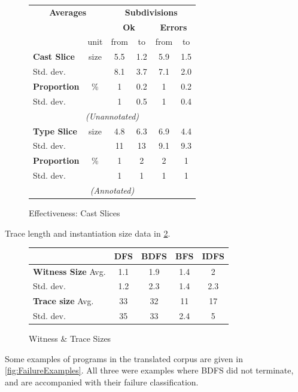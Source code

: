 \begin{figure}[h]
  \centering
  \begin{tabular}{lc|cc|cc}
  \multicolumn{2}{c}{\textbf{Averages}} & \multicolumn{4}{c}{\textbf{Subdivisions}}\\
  & & \multicolumn{2}{c|}{\textbf{Ok}} & \multicolumn{2}{c}{\textbf{Errors}}\\ 
   & unit & from & to & from & to\\
   \hline
   \textbf{Cast Slice} & size &  5.5 & 1.2 & 5.9 & 1.5 \\
   Std. dev. &  				 &  8.1 & 3.7 & 7.1 & 2.0\\
   \textbf{Proportion}& \%    & 1 & 0.2 & 1 & 0.2\\
   Std. dev. &  				 &  1 & 0.5 & 1 & 0.4\\
   \multicolumn{6}{c}{\textit{(Unannotated)}}\\
   \textbf{Type Slice} & size &  4.8 & 6.3 & 6.9 & 4.4  \\
   Std. dev. 			&    &  11 & 13 & 9.1 & 9.3\\
   \textbf{Proportion}& \% 	 & 1 & 2 & 2 & 1\\
   Std. dev. &  				 &  1 & 1 & 1 & 1\\
   \multicolumn{6}{c}{\textit{(Annotated)}}
  \end{tabular}
  \caption{Effectiveness: Cast Slices}
\label{fig:CastSlicingEffectiveness}
\end{figure}

Trace length and instantiation size data in \cref{fig:WitnessSize}.
\begin{figure}[h]\centering
\begin{tabular}{l|cccc}
& DFS & BDFS & BFS & IDFS\\
\hline
\textbf{Witness Size} Avg. & 1.1& 1.9&1.4&  2\\
Std. dev. & 1.2& 2.3&1.4&  2.3\\
\textbf{Trace size} Avg. & 33& 32& 11& 17\\
Std. dev. & 35& 33&2.4& 5
\end{tabular}
\caption{Witness \& Trace Sizes}
\label{fig:WitnessSize}
\end{figure}

Some examples of programs in the translated corpus are given in \cref{fig:FailureExamples}. All three were examples where BDFS did not terminate, and are accompanied with their failure classification.

